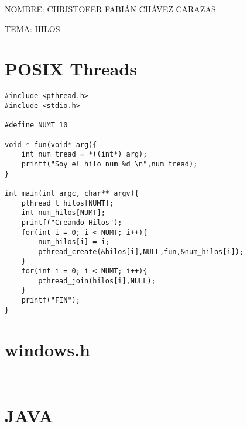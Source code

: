 \documentclass[a4paper,12pt]{article}
\begin{document}
\begin{Large}
 NOMBRE: CHRISTOFER FABIÁN CHÁVEZ CARAZAS \par
 TEMA: HILOS
\end{Large}

\section{POSIX Threads}

\begin{lstlisting}
#include <pthread.h>
#include <stdio.h>

#define NUMT 10

void * fun(void* arg){
	int num_tread = *((int*) arg);
	printf("Soy el hilo num %d \n",num_tread);
}

int main(int argc, char** argv){
	pthread_t hilos[NUMT];
	int num_hilos[NUMT];
	printf("Creando Hilos");
	for(int i = 0; i < NUMT; i++){
		num_hilos[i] = i;
		pthread_create(&hilos[i],NULL,fun,&num_hilos[i]);
	}
	for(int i = 0; i < NUMT; i++){
		pthread_join(hilos[i],NULL);
	}
	printf("FIN");
}
\end{lstlisting}

\section{windows.h}

\begin{lstlisting}
 
\end{lstlisting}


\section{JAVA}
\end{document}
